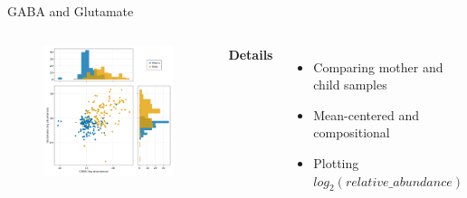
\begin{frame}{GABA and Glutamate}
    \begin{columns}[c] %

    
        \begin{figure}
        \includegraphics[width=1\linewidth]{../figures/gaba-glutamate.png}
        \end{figure}

    
        \textbf{Details}
        \begin{itemize}
            \item Comparing mother and child samples
            \item Mean-centered and compositional
            \item Plotting $log_2(relative\_abundance)$
        \end{itemize}

    \end{columns}

\end{frame}

